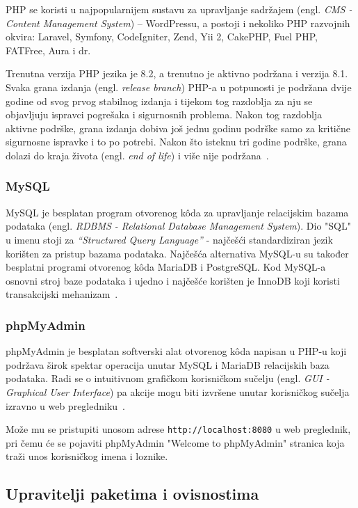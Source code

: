 PHP se koristi u najpopularnijem sustavu za upravljanje
sadržajem (engl. \textit{CMS - Content Management System}) – WordPressu, a postoji i nekoliko PHP razvojnih okvira: Laravel, Symfony, CodeIgniter, Zend, Yii 2, CakePHP, Fuel PHP, FATFree, Aura i dr.~\cite{Brekalo}

Trenutna verzija PHP jezika je 8.2, a trenutno je aktivno podržana i verzija 8.1. Svaka grana izdanja (engl. \textit{release branch}) PHP-a u potpunosti je podržana dvije godine od svog prvog stabilnog izdanja i tijekom tog razdoblja za nju se objavljuju ispravci pogrešaka i sigurnosnih problema. Nakon tog razdoblja aktivne podrške, grana izdanja dobiva još jednu godinu podrške samo za kritične sigurnosne ispravke i to po potrebi. Nakon što isteknu tri godine podrške, grana dolazi do kraja života (engl. \textit{end of life}) i više nije podržana~\cite{phpVersions}.

\subsubsection{MySQL}
MySQL je besplatan program otvorenog k\^oda za upravljanje relacijskim bazama podataka (engl. \textit{RDBMS - Relational Database Management System}). Dio "SQL" u imenu stoji za \textit{“Structured Query Language”} - najčešći standardiziran jezik korišten za pristup bazama podataka. Najčešća alternativa MySQL-u su također besplatni programi otvorenog k\^oda MariaDB i PostgreSQL. Kod MySQL-a osnovni stroj baze podataka i ujedno i najčešće korišten je InnoDB koji koristi transakcijski mehanizam~\cite{Brekalo}.

\subsubsection{phpMyAdmin}
phpMyAdmin je besplatan softverski alat otvorenog k\^oda napisan u PHP-u koji podržava širok spektar operacija unutar MySQL i MariaDB relacijskih baza podataka. Radi se o intuitivnom grafičkom korisničkom sučelju (engl. \textit{GUI - Graphical User Interface}) pa akcije mogu biti izvršene unutar korisničkog sučelja izravno u web pregledniku~\cite{Brekalo}.

Može mu se pristupiti unosom adrese \texttt{http://localhost:8080} u web preglednik, pri čemu će se pojaviti phpMyAdmin "Welcome to phpMyAdmin" stranica koja traži unos korisničkog imena i loznike.

\subsection{Upravitelji paketima i ovisnostima}

